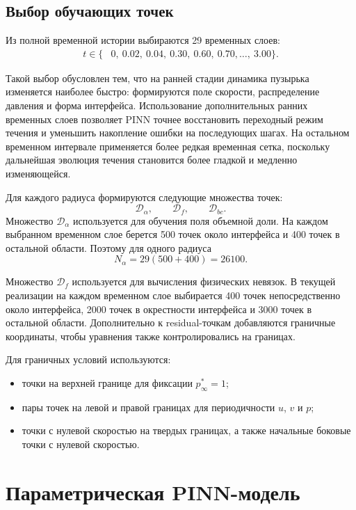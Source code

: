 \documentclass[12pt,a4paper]{article}
\begin{document}
\subsection{Выбор обучающих точек}

Из полной временной истории выбираются 29 временных слоев:
\[
\begin{split}
    t\in\{&
    0,\ 0.02,\ 0.04,\ 0.30,\ 0.60,\ 0.70,\ldots,\ 3.00
    \}.
\end{split}
\]

Такой выбор обусловлен тем, что на ранней стадии динамика пузырька изменяется наиболее быстро: формируются поле скорости, распределение давления и форма интерфейса. Использование дополнительных ранних временных слоев позволяет PINN точнее восстановить переходный режим течения и уменьшить накопление ошибки на последующих шагах. На остальном временном интервале применяется более редкая временная сетка, поскольку дальнейшая эволюция течения становится более гладкой и медленно изменяющейся.

Для каждого радиуса формируются следующие множества точек:
\[
    \mathcal{D}_\alpha,\qquad
    \mathcal{D}_f,\qquad
    \mathcal{D}_{bc}.
\]
Множество \(\mathcal{D}_\alpha\) используется для обучения поля объемной доли.
На каждом выбранном временном слое берется 500 точек около интерфейса и
400 точек в остальной области. Поэтому для одного радиуса
\[
    N_\alpha = 29(500+400)=26100.
\]

Множество \(\mathcal{D}_f\) используется для вычисления физических невязок.
В текущей реализации на каждом временном слое выбирается 400 точек
непосредственно около интерфейса, 2000 точек в окрестности интерфейса и
3000 точек в остальной области. Дополнительно к residual-точкам добавляются
граничные координаты, чтобы уравнения также контролировались на границах.

Для граничных условий используются:
\begin{itemize}
    \item точки на верхней границе для фиксации \(p_\infty^*=1\);
    \item пары точек на левой и правой границах для периодичности \(u\), \(v\)
    и \(p\);
    \item точки с нулевой скоростью на твердых границах, а также начальные
    боковые точки с нулевой скоростью.
\end{itemize}

\section{Параметрическая PINN-модель}
\end{document}

